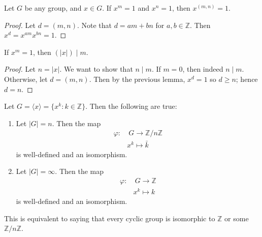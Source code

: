 \documentclass{article}
\theoremstyle{plain}
\newcommand{\Z}{\mathbb{Z}}
\begin{document}
\begin{lemma}{}{}
Let $G$ be any group, and $x \in G$. If $x^m = 1$ and $x^n = 1$, then $x^{(m,n)} = 1$.
\end{lemma}
\begin{proof}
Let $d = (m,n)$. Note that $d = am + bn$ for $a,b \in \Z$. Then $x^d = x^{am}x^{bn} = 1$.
\end{proof}
\begin{lemma}{}{}
If $x^m = 1$, then $(|x|)\mid m$.
\end{lemma}
\begin{proof}
Let $n = |x|$. We want to show that $n\mid m$. If $m=0$, then indeed $n\mid m$. Otherwise, let $d = (m,n)$. Then by the previous lemma, $x^d = 1$ so $d \ge n$; hence $d = n$.
\end{proof}

\begin{theorem}{}{}
Let $G = \langle x \rangle = \{x^k : k \in \Z \}$. Then the following are true:
\begin{enumerate}
\item Let $|G| = n$. Then the map
\begin{align*}
\varphi : &\ G \to \Z/n\Z \\
&x^k \mapsto \bar{k}
\end{align*}
is well-defined and an isomorphism.
\item Let $|G| = \infty$. Then the map
\begin{align*}
\varphi : &\ G \to \Z \\
&x^k \mapsto k
\end{align*}
is well-defined and an isomorphism.
\end{enumerate}
This is equivalent to saying that every cyclic group is isomorphic to $\Z$ or some $\Z/n\Z$.
\end{theorem}
\end{document}
